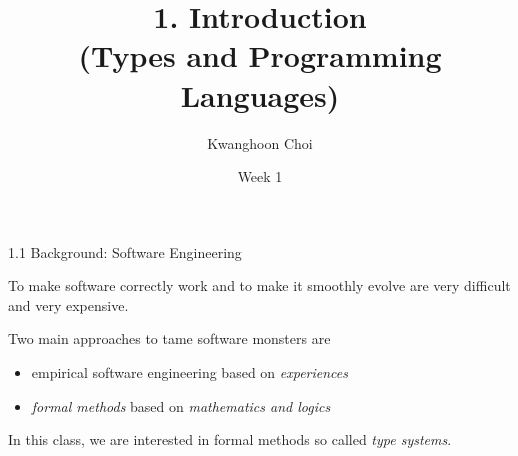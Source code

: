 \documentclass[table]{beamer}
\title[Types and Programming Languages]{1. Introduction \\
(Types and Programming Languages)}
\author[K. Choi]{Kwanghoon Choi}
\institute[Chonnam National University]{
Software Languages and Systems Laboratory \\
	Chonnam National University}
\date{Week 1}
\begin{document}
\begin{frame}
	\titlepage
	
\end{frame}


\begin{frame}[t]{1.1 Background: Software Engineering} \vspace{10pt}

To make software correctly work and to make it smoothly evolve are very difficult and very expensive.

\vspace{10pt}

Two main approaches to tame  software monsters are 
\begin{itemize}
\item empirical software engineering based on {\it experiences}

\item {\it formal methods}  based on {\it mathematics and logics}

\end{itemize}

\vspace{10pt}

In this class, we are interested in formal methods so called {\it type systems}. 

\end{frame}
\end{document}
